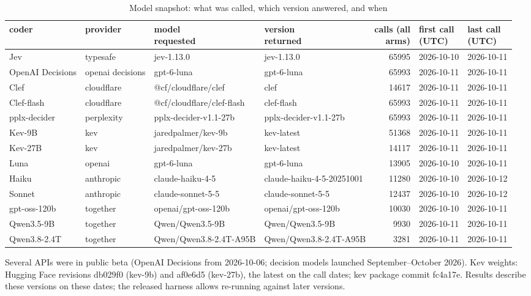 \begin{table}[t]
\centering
\small
\caption{Model snapshot: what was called, which version answered, and when}
\label{tab:tab18_model_snapshot}
\begin{adjustbox}{max width=\linewidth}
\begin{tabular}{llllrll}
\toprule
coder & provider & \makecell[bl]{model \\{} requested} & \makecell[bl]{version \\{} returned} & \makecell[br]{calls (all \\{} arms)} & \makecell[bl]{first call \\{} (UTC)} & \makecell[bl]{last call \\{} (UTC)} \\
\midrule
Jev & typesafe & jev-1.13.0 & jev-1.13.0 & 65995 & 2026-10-10 & 2026-10-11 \\
OpenAI Decisions & openai decisions & gpt-6-luna & gpt-6-luna & 65993 & 2026-10-11 & 2026-10-11 \\
Clef & cloudflare & @cf/cloudflare/clef & clef & 14617 & 2026-10-11 & 2026-10-11 \\
Clef-flash & cloudflare & @cf/cloudflare/clef-flash & clef-flash & 65993 & 2026-10-11 & 2026-10-11 \\
pplx-decider & perplexity & pplx-decider-v1.1-27b & pplx-decider-v1.1-27b & 65993 & 2026-10-11 & 2026-10-11 \\
Kev-9B & kev & jaredpalmer/kev-9b & kev-latest & 51368 & 2026-10-11 & 2026-10-11 \\
Kev-27B & kev & jaredpalmer/kev-27b & kev-latest & 14117 & 2026-10-11 & 2026-10-11 \\
Luna & openai & gpt-6-luna & gpt-6-luna & 13905 & 2026-10-10 & 2026-10-11 \\
Haiku & anthropic & claude-haiku-4-5 & claude-haiku-4-5-20251001 & 11280 & 2026-10-10 & 2026-10-12 \\
Sonnet & anthropic & claude-sonnet-5-5 & claude-sonnet-5-5 & 12437 & 2026-10-10 & 2026-10-12 \\
gpt-oss-120b & together & openai/gpt-oss-120b & openai/gpt-oss-120b & 10030 & 2026-10-10 & 2026-10-11 \\
Qwen3.5-9B & together & Qwen/Qwen3.5-9B & Qwen/Qwen3.5-9B & 9930 & 2026-10-11 & 2026-10-11 \\
Qwen3.8-2.4T & together & Qwen/Qwen3.8-2.4T-A95B & Qwen/Qwen3.8-2.4T-A95B & 3281 & 2026-10-11 & 2026-10-11 \\
\bottomrule
\end{tabular}
\end{adjustbox}
\par\smallskip\footnotesize\raggedright Several APIs were in public beta (OpenAI Decisions from 2026-10-06; decision models launched September--October 2026). Kev weights: Hugging Face revisions db029f0 (kev-9b) and af0e6d5 (kev-27b), the latest on the call dates; kev package commit fc4a17e. Results describe these versions on these dates; the released harness allows re-running against later versions.
\end{table}
